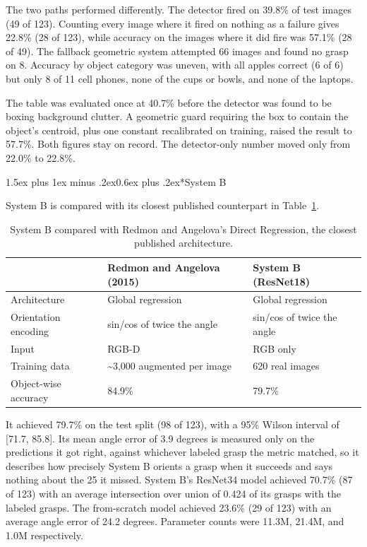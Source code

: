 \documentclass[12pt,letterpaper]{article}
\makeatletter
\renewcommand{\subsection}{\@startsection{subsection}{2}{0pt}%
  {1.5ex plus 1ex minus .2ex}{0.6ex plus .2ex}{\normalsize\itshape}}
\makeatother
\begin{document}
The two paths performed differently. The detector fired on 39.8\% of
test images (49 of 123). Counting every image where it fired on nothing
as a failure gives 22.8\% (28 of 123), while accuracy on the images
where it did fire was 57.1\% (28 of 49). The fallback geometric system
attempted 66 images and found no grasp on 8. Accuracy by object
category was uneven, with all apples correct (6 of 6) but only 8 of 11
cell phones, none of the cups or bowls, and none of the laptops.

The table was evaluated once at 40.7\% before the detector was found to
be boxing background clutter. A geometric guard requiring the box to
contain the object's centroid, plus one constant recalibrated on
training, raised the result to 57.7\%. Both figures stay on record. The
detector-only number moved only from 22.0\% to 22.8\%.

\subsection*{System B}

System B is compared with its closest published counterpart in
Table~\ref{tab:redmon}.

\begin{table}[H]
\centering
\caption{System B compared with Redmon and Angelova's Direct
Regression, the closest published architecture.}
\label{tab:redmon}
\begin{tabular}{lll}
\toprule
 & Redmon and Angelova (2015) & System B (ResNet18) \\
\midrule
Architecture         & Global regression & Global regression \\
Orientation encoding & sin/cos of twice the angle
                     & sin/cos of twice the angle \\
Input                & RGB-D & RGB only \\
Training data        & \textasciitilde{}3,000 augmented per image
                     & 620 real images \\
Object-wise accuracy & 84.9\% & 79.7\% \\
\bottomrule
\end{tabular}
\end{table}

It achieved 79.7\% on the test split (98 of 123), with a 95\% Wilson
interval of [71.7, 85.8]. Its mean angle error of 3.9 degrees is
measured only on the predictions it got right, against whichever
labeled grasp the metric matched, so it describes how precisely System
B orients a grasp when it succeeds and says nothing about the 25 it
missed. System B's ResNet34 model achieved 70.7\% (87 of 123) with an
average intersection over union of 0.424 of its grasps with the labeled
grasps. The from-scratch model achieved 23.6\% (29 of 123) with an
average angle error of 24.2 degrees. Parameter counts were 11.3M,
21.4M, and 1.0M respectively.
\end{document}
